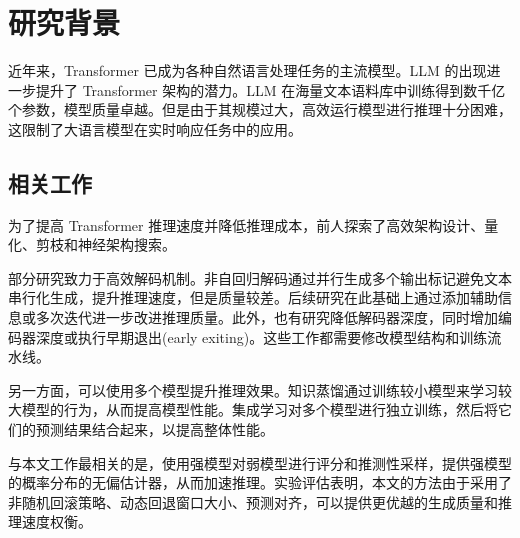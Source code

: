 \chapter{研究背景}

近年来，Transformer 已成为各种自然语言处理任务的主流模型。LLM 的出现进一步提升了 Transformer 架构的潜力。LLM 在海量文本语料库中训练得到数千亿个参数，模型质量卓越。但是由于其规模过大，高效运行模型进行推理十分困难，这限制了大语言模型在实时响应任务中的应用。

\section{相关工作}
为了提高 Transformer 推理速度并降低推理成本，前人探索了高效架构设计、量化、剪枝和神经架构搜索。

部分研究致力于高效解码机制。非自回归解码通过并行生成多个输出标记避免文本串行化生成，提升推理速度，但是质量较差。后续研究在此基础上通过添加辅助信息或多次迭代进一步改进推理质量。此外，也有研究降低解码器深度，同时增加编码器深度或执行早期退出(early exiting)。这些工作都需要修改模型结构和训练流水线。

另一方面，可以使用多个模型提升推理效果。知识蒸馏通过训练较小模型来学习较大模型的行为，从而提高模型性能。集成学习对多个模型进行独立训练，然后将它们的预测结果结合起来，以提高整体性能。

与本文工作最相关的是，使用强模型对弱模型进行评分和推测性采样，提供强模型的概率分布的无偏估计器，从而加速推理。实验评估表明，本文的方法由于采用了非随机回滚策略、动态回退窗口大小、预测对齐，可以提供更优越的生成质量和推理速度权衡。
